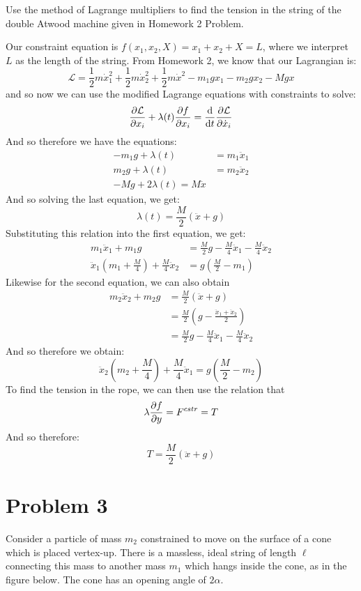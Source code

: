 \documentclass[10pt]{article}
\begin{document}
	Use the method of Lagrange multipliers to find the tension in the string of the double Atwood machine
	given in Homework 2 Problem. 

	\begin{solution}
			Our constraint equation is $f(x_1, x_2, X) = x_1 + x_2 + X = L$, where we 
			interpret $L$ as the length of the string. From Homework 2, we know that our Lagrangian 
			is:
			\[\mathcal L = \frac 12 m\dot x_1^2 + \frac 12 m \dot x_2^2 + \frac 12 m\dot x^2 - m_1gx_1
			- m_2gx_2 - Mgx\]
			and so now we can use the modified Lagrange equations with constraints to solve: 
			\[ \pdv{\mathcal L}{x_i} + \lambda(t) \pdv{f}{x_i} = \dv{t} \pdv{\mathcal L}{\dot x_i}\] 
			And so therefore we have the equations: 
			\begin{align*}
					-m_1g + \lambda(t) &= m_1 \ddot x_1\\
					m_2g + \lambda(t) &= m_2\ddot x_2\\
					-Mg + 2\lambda(t) = M\ddot x
			\end{align*}
			And so solving the last equation, we get:
			\[ \lambda(t) = \frac{M}{2}(\ddot x + g)\]
			Substituting this relation into the first equation, we get: 
			\begin{align*}
					m_1 \ddot x_1 + m_1g &= \frac{M}{2} g - \frac{M}{4}\ddot x_1 - \frac{M}{4}\ddot x_2\\
					\ddot x_1\left(m_1+\frac{M}{4}\right) + \frac{M}{4} \ddot x_2 &= g\left( \frac{M}{2} - 
							m_1\right)
			\end{align*}
			Likewise for the second equation, we can also obtain
			\begin{align*}
					m_2\ddot x_2 + m_2g &= \frac{M}{2}(\ddot x + g)\\
					&= \frac{M}{2}\left( g - \frac{\ddot x_1 + \ddot x_2}{2}\right)\\
					&= \frac{M}{2}g - \frac{M}{4}\ddot x_1 - \frac{M}{4} \ddot x_2
			\end{align*}
			And so therefore we obtain:
			\[ \ddot x_2\left( m_2 + \frac{M}{4} \right) + \frac{M}{4}\ddot x_1 = g\left( \frac{M}{2} - 
			m_2\right)\]
			To find the tension in the rope, we can then use the relation that 
			\[ \lambda \pdv{f}{y} = F^{cstr} = T\]
			And so therefore: 
			\[ T = \frac{M}{2}(\ddot x + g)\]

	\end{solution}
	\pagebreak

	\section*{Problem 3}
	Consider a particle of mass $m_2$ constrained to move on the surface of a cone which is placed vertex-up.
	There is a massless, ideal string of length $\ell$ connecting this mass to another mass $m_1$ which hangs
	inside the cone, as in the figure below. The cone has an opening angle of $2\alpha$.
\end{document}
